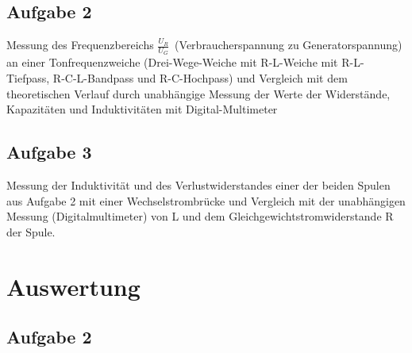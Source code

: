 \documentclass{article}
\begin{document}
\subsection{Aufgabe 2}
Messung des Frequenzbereichs \(\frac{U_{R}}{U_{G}}\)\ (Verbraucherspannung zu Generatorspannung) an einer Tonfrequenzweiche (Drei-Wege-Weiche mit R-L-Weiche mit R-L-Tiefpass, R-C-L-Bandpass und R-C-Hochpass) und Vergleich mit dem theoretischen Verlauf durch unabhängige Messung der Werte der Widerstände, Kapazitäten und Induktivitäten mit Digital-Multimeter

\subsection{Aufgabe 3}
Messung der Induktivität und des Verlustwiderstandes einer der beiden Spulen aus Aufgabe 2 mit einer Wechselstrombrücke und Vergleich mit der unabhängigen Messung (Digitalmultimeter) von L und dem Gleichgewichtstromwiderstande R der Spule.

\newpage
\section{Auswertung}

\newpage
\subsection{Aufgabe 2}

\newpage

\end{document}
